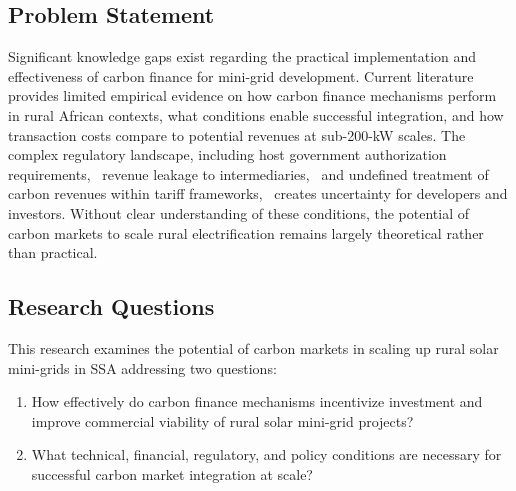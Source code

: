 \subsection{Problem Statement}
\label{subsec:problem}
Significant knowledge gaps exist regarding the practical implementation and effectiveness of carbon finance for mini-grid development. Current literature provides limited empirical evidence on how carbon finance mechanisms perform in rural African contexts, what conditions enable successful integration, and how transaction costs compare to potential revenues at sub-200-kW scales. The complex regulatory landscape, including host government authorization requirements,~\cite{schneider-integrity,ahonen-governance} revenue leakage to intermediaries,~\cite{power-africa-credits} and undefined treatment of carbon revenues within tariff frameworks,~\cite{kreibich2021} creates uncertainty for developers and investors. Without clear understanding of these conditions, the potential of carbon markets to scale rural electrification remains largely theoretical rather than practical.

\subsection{Research Questions}
\label{subsec:rqs}
This research examines the potential of carbon markets in scaling up rural solar mini-grids in SSA addressing two questions:
\begin{enumerate}
    \item[RQ1:] How effectively do carbon finance mechanisms incentivize investment and improve commercial viability of rural solar mini-grid projects?
    \item[RQ2:] What technical, financial, regulatory, and policy conditions are necessary for successful carbon market integration at scale?
\end{enumerate}

